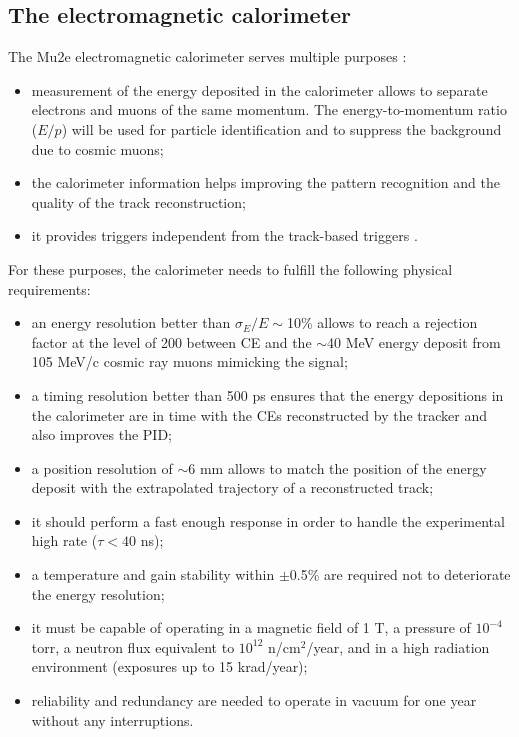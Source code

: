 \subsection{The electromagnetic calorimeter}\label{calorimeter}
The Mu2e electromagnetic calorimeter serves multiple purposes \cite{em4}:
\begin{itemize}
    \item measurement of the energy deposited in the calorimeter 
    allows to separate electrons and muons of the same momentum. 
    The energy-to-momentum ratio ($E/p$) will be used for particle 
    identification and to suppress the background due to cosmic muons;
  \item the calorimeter information 
    helps improving the pattern recognition and 
    the quality of the track reconstruction;
    \item it provides triggers independent from the track-based triggers \cite{em6}. 
\end{itemize} 
For these purposes, the calorimeter needs to fulfill the following physical requirements:
\begin{itemize}
    \item an energy resolution better than $\sigma_E/E \sim$10\% allows
     to reach a rejection factor at the level of 200 between CE
    and the $\sim$40 MeV energy deposit from 105 MeV/c cosmic ray muons mimicking the signal;
    \item a timing resolution better than 500 ps ensures that
    the energy depositions in the calorimeter are in time with
    the CEs reconstructed by the tracker and
    also improves the PID;
    \item a position resolution of $\sim$6 mm allows 
    to match the position of the energy deposit with the 
    extrapolated trajectory of a reconstructed track;
    \item it should perform a fast enough 
      response in order to handle the experimental high rate ($\tau < 40$ ns);
    \item a temperature and gain stability within $\pm$0.5\% 
    are required not to deteriorate the energy resolution;
    \item it must be capable of operating in 
    a magnetic field of 1 T, a pressure of \(10^{-4}\) torr, a 
    neutron flux equivalent to \(10^{12}\) n/cm\(^2\)/year, 
    and in a high radiation environment (exposures up to 15 krad/year);
    \item reliability and redundancy are needed to operate in vacuum for one
    year without any interruptions.
\end{itemize}



